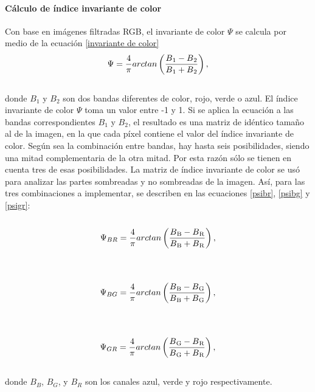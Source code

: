 \paragraph{Cálculo de índice invariante de color}
Con base en imágenes filtradas RGB, el invariante de color $\Psi$ se calcula por medio de la ecuación \ref{invariante de color}
\\
\begin{equation}
	\Psi=\frac{4}{\pi} arctan\left(\frac{B\textsubscript{1}-B\textsubscript{2}}{B\textsubscript{1}+B\textsubscript{2}}\right),\label{invariante de color}
\end{equation}
\\
 donde $B_1$ y $B_2$ son dos bandas diferentes de color, rojo, verde o azul. El índice invariante de color $\Psi$ toma un valor entre -1 y 1. Si se aplica la ecuación a las bandas correspondientes $B_1$ y $B_2$, el resultado es una matriz de idéntico tamaño al de la imagen, en la que cada píxel contiene el valor del índice invariante de color. Según sea la combinación entre bandas, hay hasta seis posibilidades, siendo una mitad complementaria de la otra mitad. Por esta razón sólo se tienen en cuenta tres de esas posibilidades. La matriz de índice invariante de color se usó para analizar las partes sombreadas y no sombreadas de la imagen. Así, para las tres combinaciones a implementar, se describen en las ecuaciones \ref{psibr}, \ref{psibg} y \ref{psigr}:
 \\
 \\
\begin{equation}
	\Psi_{BR}=\frac{4}{\pi} arctan\left(\frac{B\textsubscript{B}-B\textsubscript{R}}{B\textsubscript{B}+B\textsubscript{R}}\right),\label{psibr}
\end{equation}
\\
\\
\begin{equation}
	\Psi_{BG}=\frac{4}{\pi} arctan\left(\frac{B\textsubscript{B}-B\textsubscript{G}}{B\textsubscript{B}+B\textsubscript{G}}\right),\label{psibg}
\end{equation}
\\
\\
\begin{equation}
	\Psi_{GR}=\frac{4}{\pi} arctan\left(\frac{B\textsubscript{G}-B\textsubscript{R}}{B\textsubscript{G}+B\textsubscript{R}}\right),\label{psigr}
\end{equation}
\\
donde $B_{B}$, $B_{G}$, y $B_{R}$ son los canales azul, verde y rojo respectivamente.
